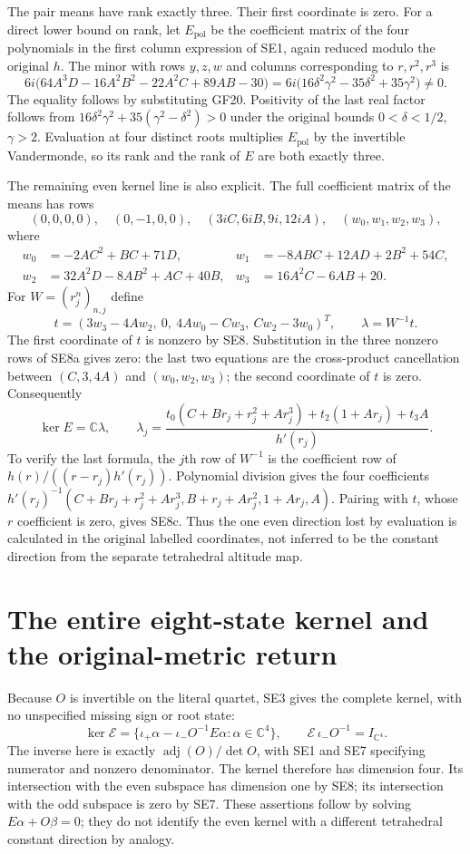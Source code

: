 \documentclass[11pt]{article}
\newcommand{\C}{\mathbb C}
\begin{document}
The pair means have rank exactly three. Their first coordinate is zero.
For a direct lower bound on rank, let $E_{\mathrm{pol}}$ be the coefficient
matrix of the four polynomials in the first column expression of SE1,
again reduced modulo the original $h$. The minor with rows $y,z,w$
and columns corresponding to $r,r^2,r^3$ is
\[
 6i\bigl(64A^3D-16A^2B^2-22A^2C+89AB-30\bigr)
 =6i\bigl(16\delta^2\gamma^2-35\delta^2+35\gamma^2\bigr)\ne0.
 \tag{SE8}
\]
The equality follows by substituting GF20. Positivity of the last
real factor follows from
$16\delta^2\gamma^2+35(\gamma^2-\delta^2)>0$ under the original
bounds $0<\delta<1/2$, $\gamma>2$. Evaluation at four distinct
roots multiplies $E_{\mathrm{pol}}$ by the invertible Vandermonde,
so its rank and the rank of $E$ are both exactly three.

The remaining even kernel line is also explicit. The full coefficient
matrix of the means has rows
\[
 (0,0,0,0),\quad(0,-1,0,0),\quad(3iC,6iB,9i,12iA),\quad
 (w_0,w_1,w_2,w_3),
\]
where
\[
\begin{aligned}
 w_0&=-2AC^2+BC+71D,&w_1&=-8ABC+12AD+2B^2+54C,\\
 w_2&=32A^2D-8AB^2+AC+40B,&w_3&=16A^2C-6AB+20.
\end{aligned}\tag{SE8a}
\]
For $W=(r_j^n)_{n,j}$ define
\[
 t=(3w_3-4Aw_2,\ 0,\ 4Aw_0-Cw_3,\ Cw_2-3w_0)^T,
 \qquad \lambda=W^{-1}t.
 \tag{SE8b}
\]
The first coordinate of $t$ is nonzero by SE8. Substitution in
the three nonzero rows of SE8a gives zero: the last two equations
are the cross-product cancellation between $(C,3,4A)$ and
$(w_0,w_2,w_3)$; the second coordinate of $t$ is zero. Consequently
\[
 \ker E=\C\lambda,\qquad
 \lambda_j=
 \frac{t_0(C+Br_j+r_j^2+Ar_j^3)+t_2(1+Ar_j)+t_3A}{h'(r_j)}.
 \tag{SE8c}
\]
To verify the last formula, the $j$th row of $W^{-1}$ is the
coefficient row of $h(r)/((r-r_j)h'(r_j))$. Polynomial division
gives the four coefficients
$h'(r_j)^{-1}(C+Br_j+r_j^2+Ar_j^3,B+r_j+Ar_j^2,1+Ar_j,A)$.
Pairing with $t$, whose $r$ coefficient is zero, gives SE8c.
Thus the one even direction lost by evaluation is calculated
in the original labelled coordinates, not inferred to be the
constant direction from the separate tetrahedral altitude map.

\section{The entire eight-state kernel and the original-metric return}
Because $O$ is invertible on the literal quartet, SE3 gives the complete
kernel, with no unspecified missing sign or root state:
\[
 \ker\mathcal E=
 \{\iota_+\alpha-\iota_-O^{-1}E\alpha:\alpha\in\C^4\},
 \qquad
 \mathcal E\,\iota_-O^{-1}=I_{\C^4}.
 \tag{SE9}
\]
The inverse here is exactly $\operatorname{adj}(O)/\det O$, with
SE1 and SE7 specifying numerator and nonzero denominator. The kernel
therefore has dimension four. Its intersection with the even subspace
has dimension one by SE8; its intersection with the odd subspace is zero
by SE7. These assertions follow by solving $E\alpha+O\beta=0$;
they do not identify the even kernel with a different tetrahedral
constant direction by analogy.
\end{document}
